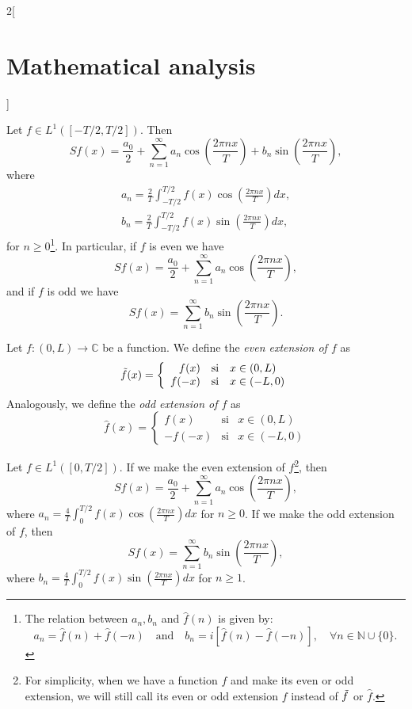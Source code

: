 \documentclass[../../../main.tex]{subfiles}
\begin{document}
\begin{multicols}{2}[\section{Mathematical analysis}]
\begin{definition}
\end{definition}
\begin{prop}
Let $f\in L^1([-T/2,T/2])$. Then $$Sf(x)=\frac{a_0}{2}+\sum_{n=1}^\infty a_n\cos\left(\frac{2\pi nx}{T}\right)+b_n\sin\left(\frac{2\pi nx}{T}\right),$$ where \begin{gather*}
    a_n=\frac{2}{T}\int_{-T/2}^{T/2}f(x)\cos\left(\frac{2\pi nx}{T}\right)dx,\\ b_n=\frac{2}{T}\int_{-T/2}^{T/2}f(x)\sin\left(\frac{2\pi nx}{T}\right)dx,
\end{gather*} for $n\geq 0$\footnote{The relation between $a_n,b_n$ and $\widehat{f}(n)$ is given by: $$a_n=\widehat{f}(n)+\widehat{f}(-n)\quad\text{and}\quad b_n=i\left[\widehat{f}(n)-\widehat{f}(-n)\right],\quad\forall n\in\mathbb{N}\cup\{0\}.$$}. In particular, if $f$ is even we have $$Sf(x)=\frac{a_0}{2}+\sum_{n=1}^\infty a_n\cos\left(\frac{2\pi nx}{T}\right),$$ and if $f$ is odd we have $$Sf(x)=\sum_{n=1}^\infty b_n\sin\left(\frac{2\pi nx}{T}\right).$$ 
\end{prop}
\begin{definition}
Let $f:(0,L)\rightarrow\mathbb{C}$ be a function. We define the \textit{even extension of $f$} as $$\Tilde{f}(x)=\left\{
    \begin{array}{rcl}
    f(x) & \text{si} & x\in(0,L) \\
    f(-x) & \text{si} & x\in(-L,0)
    \end{array}\right.$$ Analogously, we define the \textit{odd extension of $f$} as $$\hat{f}(x)=\left\{
    \begin{array}{rcl}
    f(x) & \text{si} & x\in(0,L) \\
    -f(-x) & \text{si} & x\in(-L,0)
    \end{array}\right.$$
\end{definition}
\begin{prop}
Let $f\in L^1([0,T/2])$. If we make the even extension of $f$\footnote{For simplicity, when we have a function $f$ and make its even or odd extension, we will still call its even or odd extension $f$ instead of $\Tilde{f}$ or $\hat{f}$.}, then $$Sf(x)=\frac{a_0}{2}+\sum_{n=1}^\infty a_n\cos\left(\frac{2\pi nx}{T}\right),$$ where $\displaystyle a_n=\frac{4}{T}\int_0^{T/2}f(x)\cos\left(\frac{2\pi nx}{T}\right)dx$ for $n\geq 0$. If we make the odd extension of $f$, then $$Sf(x)=\sum_{n=1}^\infty b_n\sin\left(\frac{2\pi nx}{T}\right),$$ where $\displaystyle b_n=\frac{4}{T}\int_0^{T/2}f(x)\sin\left(\frac{2\pi nx}{T}\right)dx$ for $n\geq 1$.
\end{prop}

\end{multicols}
\end{document}
